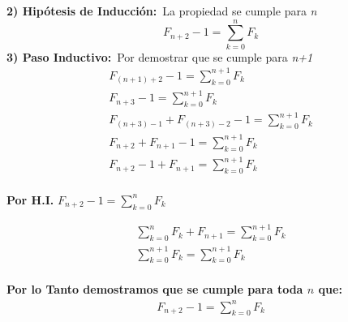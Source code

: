 \documentclass{article}
\begin{document}
\textbf{2) Hipótesis de Inducción:}\  La propiedad se cumple para \textit{n}\
\[
F_{n+2} - 1 = \sum_{k=0}^{n}F_{k}
\]
\textbf{3) Paso Inductivo:}\  Por demostrar que se cumple para \textit{n+1}\
\begin{align*}
F_{(n+1)+2} - 1 = \sum_{k=0}^{n+1}F_{k} \\
F_{n+3} - 1 = \sum_{k=0}^{n+1}F_{k} \\
F_{(n+3)-1} + F_{(n+3)-2} - 1 = \sum_{k=0}^{n+1}F_{k} \\
F_{n+2} + F_{n+1} - 1  = \sum_{k=0}^{n+1}F_{k} \\
F_{n+2} - 1 +  F_{n+1}  = \sum_{k=0}^{n+1}F_{k} \\
\end{align*}

\begin{center}
\textbf{Por H.I.} $F_{n+2} - 1  = \sum_{k=0}^{n}F_{k}$
\end{center}

\begin{align*}
\sum_{k=0}^{n}F_{k} +  F_{n+1} = \sum_{k=0}^{n+1}F_{k} \\
\sum_{k=0}^{n+1}F_{k} = \sum_{k=0}^{n+1}F_{k} \\
\end{align*}

\textbf{Por lo Tanto demostramos que se cumple para toda $n$ que:}\\ 
\begin{align*}
F_{n+2} - 1 = \sum_{k=0}^{n}F_{k} 
\end{align*}
\end{document}
